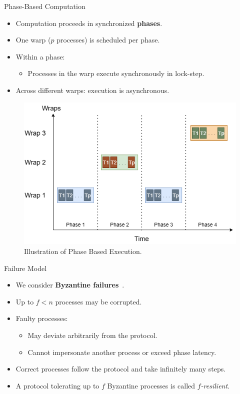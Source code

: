\documentclass{beamer}
\begin{document}
\begin{frame}{Phase-Based Computation}
\begin{itemize}
  \item Computation proceeds in synchronized \textbf{phases}.
  \item One warp ($p$ processes) is scheduled per phase.
  \item Within a phase:
    \begin{itemize}
      \item Processes in the warp execute synchronously in lock-step.
    \end{itemize}
  \item Across different warps: execution is asynchronous.
\end{itemize}

\begin{figure} 
\centering
\includegraphics[width=0.45\linewidth]{phase-based-execution.png} 
\vspace{-1em}\caption{Illustration of Phase Based Execution.} \label{fig:phase}
\end{figure}
\end{frame}

\begin{frame}{Failure Model}
\begin{itemize}
  \item We consider \textbf{Byzantine failures}~.
  \item Up to $f<n$ processes may be corrupted.
  \item Faulty processes:
    \begin{itemize}
      \item May deviate arbitrarily from the protocol.
      \item Cannot impersonate another process or exceed phase latency.
    \end{itemize}
  \item Correct processes follow the protocol and take infinitely many steps.
  \item A protocol tolerating up to $f$ Byzantine processes is called \textit{$f$-resilient}.
\end{itemize}
\end{frame}
\end{document}
